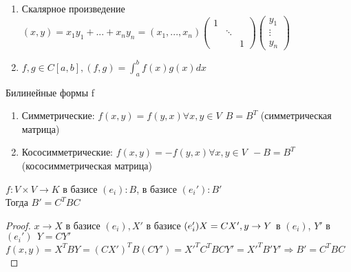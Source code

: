 \begin{Example}
	\begin{enumerate}
		\item Скалярное произведение $(x, y) = x_1y_1 + ... + x_ny_n = (x_1, ..., x_n) \left(
			\begin{array}{ccc}	
				1 & &\\
				& \ddots &\\
				& & 1
			\end{array}\right) \left(
				\begin{array}{ccc}	
					y_1\\
					\vdots\\
					y_n
				\end{array}\right)$
		\item $f, g \in C[a,b], (f, g) = \int_{a}^{b} f(x)g(x)dx$
	\end{enumerate}	
\end{Example}

\begin{Def} 
	Билинейные формы f
	\begin{enumerate}
		\item Симметрические: $f(x,y) = f(y,x) \forall x, y \in V \ \ B = B^T$ (симметрическая матрица)
		\item Кососимметрические: $f(x, y) = -f (y,x) \forall x, y \in V \ \ -B = B^T$ (кососимметрическая матрица)
	\end{enumerate}
\end{Def} 


\begin{Thm} 
	$f: V \times V \to K$ в базисе $(e_i): B$, в базисе $(e_i'): B'$\\
	Тогда $B' = C^TBC$
\end{Thm}  

\begin{proof}
	$x \to X$ в базисе $(e_i), X'$ в базисе $(e_i') X = C X',\\
	y \to Y$ в $(e_i)$, $Y'$ в $(e_i') \ \ Y = CY'$\\
	$f(x,y) = X^T B Y = (CX')^T B (CY') = X'^TC^TBCY' = X'^TB'Y' \Rightarrow B' = C^TBC$
\end{proof}

